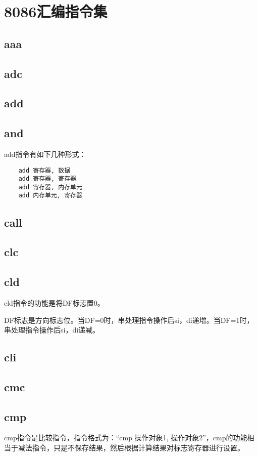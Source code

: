 \documentclass[a4paper,left=2.5cm,right=2.5cm,11pt]{article}
\begin{document}
\tableofcontents

\clearpage

\section{8086汇编指令集}
\subsection{aaa}
\subsection{adc}
\subsection{add}
\subsection{and}
	add指令有如下几种形式：
	\begin{lstlisting}
	add 寄存器, 数据
	add 寄存器, 寄存器
	add 寄存器, 内存单元
	add 内存单元, 寄存器
	\end{lstlisting}

\subsection{call}
\subsection{clc}
\subsection{cld}
	cld指令的功能是将DF标志置0。\par

	DF标志是方向标志位。当DF=0时，串处理指令操作后si，di递增。当DF=1时，串处理指令操作后si，di递减。

\subsection{cli}
\subsection{cmc}
\subsection{cmp}
	cmp指令是比较指令，指令格式为：“cmp 操作对象1, 操作对象2”，cmp的功能相当于减法指令，只是不保存结果，然后根据计算结果对标志寄存器进行设置。
	
\end{document}
